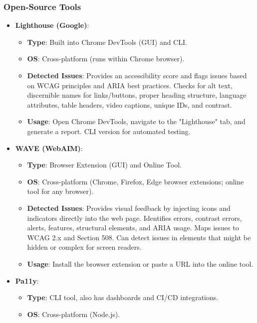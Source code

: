 \subsubsection{Open-Source Tools}
\begin{itemize}
    \item \textbf{Lighthouse (Google)}\cite{Lighthouse}:
        \begin{itemize}
            \item \textbf{Type}: Built into Chrome DevTools (GUI) and CLI.
            \item \textbf{OS}: Cross-platform (runs within Chrome browser).
            \item \textbf{Detected Issues}: Provides an accessibility score and flags issues based on WCAG principles and ARIA best practices. Checks for alt text, discernible names for links/buttons, proper heading structure, language attributes, table headers, video captions, unique IDs, and contrast.
            \item \textbf{Usage}: Open Chrome DevTools, navigate to the "Lighthouse" tab, and generate a report. CLI version for automated testing.
        \end{itemize}
    \item \textbf{WAVE (WebAIM)}\cite{WAVE}:
        \begin{itemize}
            \item \textbf{Type}: Browser Extension (GUI) and Online Tool.
            \item \textbf{OS}: Cross-platform (Chrome, Firefox, Edge browser extensions; online tool for any browser).
            \item \textbf{Detected Issues}: Provides visual feedback by injecting icons and indicators directly into the web page. Identifies errors, contrast errors, alerts, features, structural elements, and ARIA usage. Maps issues to WCAG 2.x and Section 508. Can detect issues in elements that might be hidden or complex for screen readers.
            \item \textbf{Usage}: Install the browser extension or paste a URL into the online tool.
        \end{itemize}
    \item \textbf{Pa11y}\cite{Pa11y}:
        \begin{itemize}
            \item \textbf{Type}: CLI tool, also has dashboards and CI/CD integrations.
            \item \textbf{OS}: Cross-platform (Node.js).

\end{itemize}
\end{itemize}
